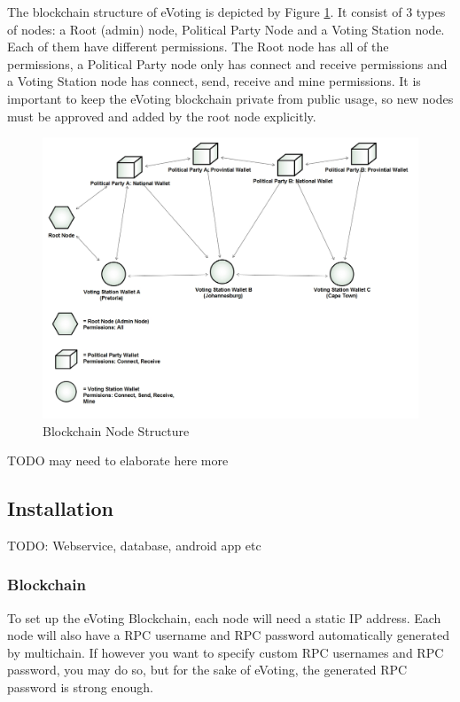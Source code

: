 \documentclass[11pt]{article}
\begin{document}
	The blockchain structure of eVoting is depicted by Figure \ref{fig:blockchainconfig}. It consist of 3 types of nodes: a Root (admin) node, Political Party Node and a Voting Station node. Each of them have different permissions. The Root node has all of the permissions, a Political Party node only has connect and receive permissions and a Voting Station node has connect, send, receive and mine permissions. It is important to keep the eVoting blockchain private from public usage, so new nodes must be approved and added by the root node explicitly.
	\newline
	
						\begin{figure}[H]
							\includegraphics[width=1.25\linewidth]{../Images/UserManual/BlockchainConfiguration1.jpg}
							\caption{Blockchain Node Structure}
							\label{fig:blockchainconfig}
						\end{figure}
						
	TODO may need to elaborate here more
	
	\subsection{Installation}
	TODO: Webservice, database, android app etc
	
	\subsubsection{Blockchain}
	To set up the eVoting Blockchain, each node will need a static IP address.\newline
	Each node will also have a RPC username and RPC password automatically generated by multichain. If however you want to specify custom RPC usernames and RPC password, you may do so, but for the sake of eVoting, the generated RPC password is strong enough.
	
\end{document}
